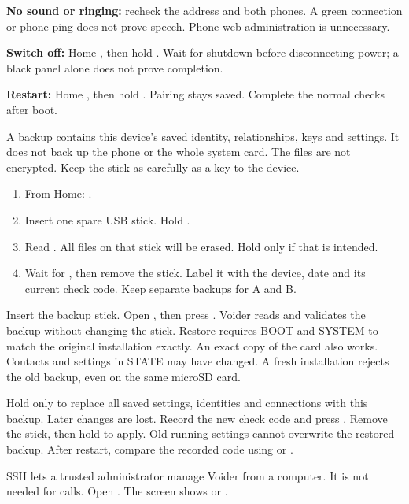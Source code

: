 \textbf{No sound or ringing:} recheck the address and both phones. A green connection or phone ping does not prove speech. Phone web administration is unnecessary.

\textbf{Switch off:} Home \arr {}, then hold . Wait for shutdown before disconnecting power; a black panel alone does not prove completion.

\textbf{Restart:} Home \arr {} \arr {}, then hold . Pairing stays saved. Complete the normal checks after boot.

A backup contains this device's saved identity, relationships, keys and settings. It does not back up the phone or the whole system card. The files are not encrypted. Keep the stick as carefully as a key to the device.
\begin{enumerate}
\item From Home:  \arr {} \arr {}.
\item Insert one spare USB stick. Hold .
\item Read . All files on that stick will be erased. Hold  only if that is intended.
\item Wait for , then remove the stick. Label it with the device, date and its current check code. Keep separate backups for A and B.
\end{enumerate}
Insert the backup stick. Open  \arr {} \arr {} \arr {}, then press . Voider reads and validates the backup without changing the stick. Restore requires BOOT and SYSTEM to match the original installation exactly. An exact copy of the card also works. Contacts and settings in STATE may have changed. A fresh installation rejects the old backup, even on the same microSD card.

Hold  only to replace all saved settings, identities and connections with this backup. Later changes are lost. Record the new check code and press . Remove the stick, then hold  to apply. Old running settings cannot overwrite the restored backup. After restart, compare the recorded code using  or .

SSH lets a trusted administrator manage Voider from a computer. It is not needed for calls. Open  \arr {} \arr {} \arr {}. The screen shows  or .

